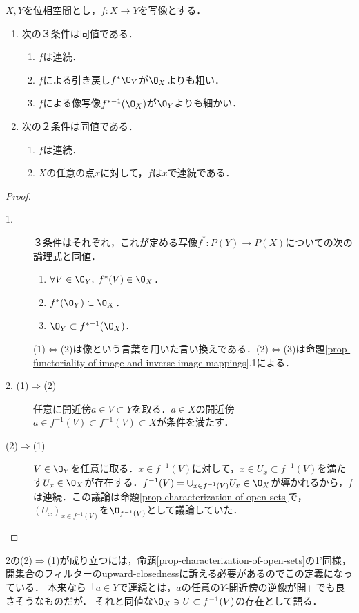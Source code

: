 \documentclass[uplatex,dvipdfmx]{jsreport}
\begin{document}
\begin{proposition}\label{prop-characterization-of-continuous-mapping-in-terms-of-frame-morphism}
    $X,Y$を位相空間とし，$f:X\to Y$を写像とする．
    \begin{enumerate}
        \item 次の３条件は同値である．\begin{enumerate}[(1)]
            \item $f$は連続．
            \item $f$による引き戻し$f^*\O_Y$が$\O_X$よりも粗い．
            \item $f$による像写像$f^{*-1}(\O_X)$が$\O_Y$よりも細かい．
        \end{enumerate}
        \item 次の２条件は同値である．\begin{enumerate}[(1)]
            \item $f$は連続．
            \item $X$の任意の点$x$に対して，$f$は$x$で連続である．
        \end{enumerate}
    \end{enumerate}
\end{proposition}
\begin{proof}\mbox{}
    \begin{description}
        \item[1.] ３条件はそれぞれ，これが定める写像$f^*:P(Y)\to P(X)$についての次の論理式と同値．
        \begin{enumerate}[(1)]
            \item $\forall V\in\O_Y,\;f^*(V)\in\O_X$．
            \item $f^*(\O_Y)\subset\O_X$．
            \item $\O_Y\subset f^{*-1}(\O_X)$．
        \end{enumerate}
        (1)$\Leftrightarrow$(2)は像という言葉を用いた言い換えである．(2)$\Leftrightarrow$(3)は命題\ref{prop-functoriality-of-image-and-inverse-image-mappings}.1による．
        \item[2. (1)$\Rightarrow$(2)] 任意に開近傍$a\in V\subset Y$を取る．$a\in X$の開近傍$a\in f^{-1}(V)\subset f^{-1}(V)\subset X$が条件を満たす．
        \item[(2)$\Rightarrow$(1)] $V\in\O_Y$を任意に取る．$x\in f^{-1}(V)$に対して，$x\in U_x\subset f^{-1}(V)$を満たす$U_x\in\O_X$が存在する．$f^{-1}(V)=\cup_{x\in f^{-1}(V)}U_x\in\O_X$が導かれるから，$f$は連続．この議論は命題\ref{prop-characterization-of-open-sets}で，$(U_x)_{x\in f^{-1}(V)}$を$\U_{f^{-1}(V)}$として議論していた．
    \end{description}
\end{proof}
\begin{remarks}
    2の(2)$\Rightarrow$(1)が成り立つには，命題\ref{prop-characterization-of-open-sets}の1'同様，
    開集合のフィルターのupward-closednessに訴える必要があるのでこの定義になっている．
    本来なら「$a\in Y$で連続とは，$a$の任意の$Y$-開近傍の逆像が開」でも良さそうなものだが．
    それと同値な$\O_X\ni U\subset f^{-1}(V)$の存在として語る．
\end{remarks}
\end{document}
